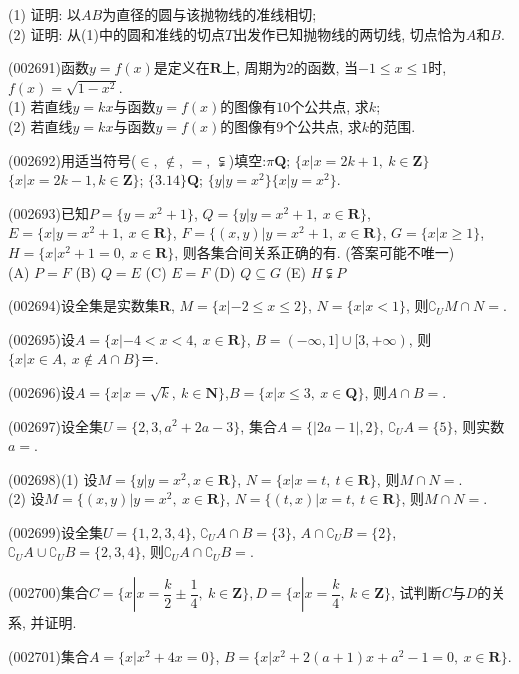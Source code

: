(1) 证明: 以$AB$为直径的圆与该抛物线的准线相切;\\ 
(2) 证明: 从(1)中的圆和准线的切点$T$出发作已知抛物线的两切线, 切点恰为$A$和$B$.
\item (002691)函数$y=f(x)$是定义在$\mathbf{R}$上, 周期为$2$的函数, 当$-1\le x\le 1$时, $f(x)=\sqrt{1-x^2}$.\\ 
(1) 若直线$y=kx$与函数$y=f(x)$的图像有$10$个公共点, 求$k$;\\ 
(2) 若直线$y=kx$与函数$y=f(x)$的图像有$9$个公共点, 求$k$的范围.
\item (002692)用适当符号($\in$, $\notin$, $=$, $\subsetneqq$)填空:$\pi$$\mathbf{Q}$; $\{x|x=2k+1, \ k\in \mathbf{Z}\}$$\{x|x=2k-1,k\in \mathbf{Z}\}$; $\{3.14\}$$\mathbf{Q}$; $\{y|y=x^2\}$$\{x|y=x^2\}$.
\item (002693)已知$P=\{y=x^2+1\}$, $Q=\{y|y=x^2+1, \ x\in \mathbf{R}\}$, $E=\{x|y=x^2+1, \  x\in \mathbf{R}\}$, $F=\{(x,y)|y=x^2+1, \ x\in \mathbf{R}\}$, $G=\{x|x\ge 1\}$, $H=\{x|x^2+1=0, \ x\in \mathbf{R}\}$, 则各集合间关系正确的有. (答案可能不唯一)\\
(A) $P=F$   (B) $Q=E$   (C) $E=F$   (D) $Q\subseteq G$  (E) $H\subsetneqq P$
\item (002694)设全集是实数集$\mathbf{R}$, $M=\{x|-2 \le x\le 2\}$, $N=\{x|x<1\}$, 则$\complement_U M\cap N=$.
\item (002695)设$A=\{x|-4<x<4, \ x\in \mathbf{R}\}$, $B=(-\infty,1]\cup [3,+\infty)$, 则$\{x|x\in A, \ x\notin A\cap B  \}$＝.
\item (002696)设$A=\{x|x=\sqrt k, \ k\in \mathbf{N}\}$,$B=\{x|x\le 3,\ x\in \mathbf{Q}\}$, 则$A\cap B=$.
\item (002697)设全集$U=\{2,3,a^2+2a-3\}$, 集合$A=\{|2a-1|,2\}$, $\complement_U A=\{5\}$, 则实数$a=$.
\item (002698)(1) 设$M=\{y|y=x^2, x\in \mathbf{R}\}$, $N=\{x|x=t,\ t\in \mathbf{R}\}$, 则$M\cap N=$.\\
(2) 设$M=\{(x,y)|y=x^2,\ x\in \mathbf{R}\}$, $N=\{(t,x)|x=t,\ t\in \mathbf{R}\}$, 则$M\cap N=$.
\item (002699)设全集$U=\{1,2,3,4\}$, $\complement_U A\cap B=\{3\}$, $A\cap \complement_U B=\{2\}$, $\complement_U A\cup \complement_U B=\{2,3,4\}$, 则$\complement_U A\cap \complement_U B=$.
\item (002700)集合$C=\{x|x=\dfrac k2\pm \dfrac14, \ k\in \mathbf{Z}\},D=\{x|x=\dfrac k4,\ k\in \mathbf{Z}\}$, 试判断$C$与$D$的关系, 并证明.
\item (002701)集合$A=\{x|x^2+4x=0\}$, $B=\{x|x^2+2(a+1)x+a^2-1=0,\ x\in \mathbf{R}\}$.\\
